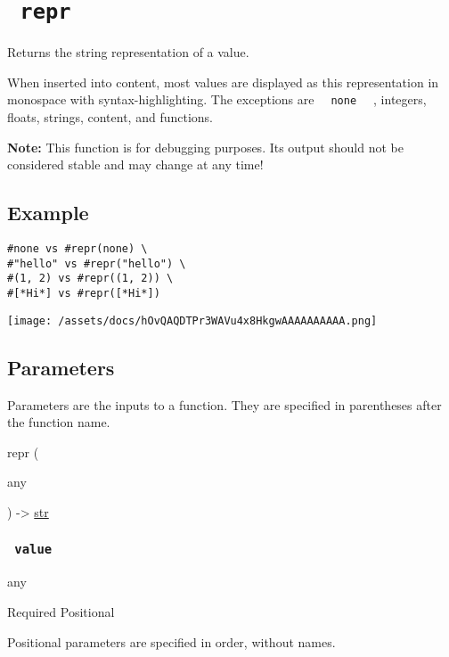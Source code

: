 \section{\texorpdfstring{\texttt{\ repr\ }}{ repr }}\label{summary}

Returns the string representation of a value.

When inserted into content, most values are displayed as this
representation in monospace with syntax-highlighting. The exceptions are
\texttt{\ }{\texttt{\ none\ }}\texttt{\ } , integers, floats, strings,
content, and functions.

\textbf{Note:} This function is for debugging purposes. Its output
should not be considered stable and may change at any time!

\subsection{Example}\label{example}

\begin{verbatim}
#none vs #repr(none) \
#"hello" vs #repr("hello") \
#(1, 2) vs #repr((1, 2)) \
#[*Hi*] vs #repr([*Hi*])
\end{verbatim}

\texttt{[image: /assets/docs/hOvQAQDTPr3WAVu4x8HkgwAAAAAAAAAA.png]}

\subsection{\texorpdfstring{{ Parameters
}}{ Parameters }}\label{parameters}

\phantomsection\label{parameters-tooltip}
Parameters are the inputs to a function. They are specified in
parentheses after the function name.

{ repr } (

{ { any } }

) -\textgreater{} \href{/docs/reference/foundations/str/}{str}

\subsubsection{\texorpdfstring{\texttt{\ value\ }}{ value }}\label{parameters-value}

{ any }

{Required} {{ Positional }}

\label{parameters-value-positional-tooltip}
Positional parameters are specified in order, without names.

